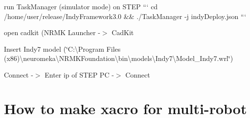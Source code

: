 \begin{DoxyItemize}
\item run Task\+Manager (simulator mode) on S\+T\+EP ``` cd /home/user/release/\+Indy\+Framework3.0 \&\& ./\+Task\+Manager -\/j indy\+Deploy.\+json ```
\item open cadkit (N\+R\+MK Launcher -\/$>$ Cad\+Kit
\begin{DoxyItemize}
\item Insert Indy7 model (\char`\"{}\+C\+:\textbackslash{}\+Program Files (x86)\textbackslash{}neuromeka\textbackslash{}\+N\+R\+M\+K\+Foundation\textbackslash{}bin\textbackslash{}models\textbackslash{}\+Indy7\textbackslash{}\+Model\+\_\+\+Indy7.\+wrl\char`\"{})
\item Connect -\/$>$ Enter ip of S\+T\+EP PC -\/$>$ Connect
\end{DoxyItemize}
\end{DoxyItemize}

\section*{How to make xacro for multi-\/robot}


